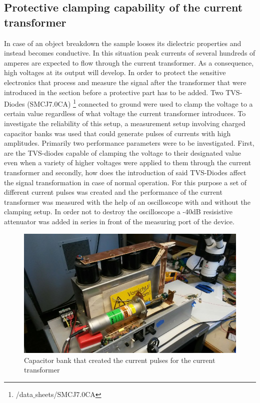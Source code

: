 \subsection{Protective clamping capability of the current transformer}
\label{clamping}

In case of an object breakdown the sample looses its dielectric properties and instead becomes conductive.
In this situation peak currents of several hundreds of amperes are expected to flow through the current transformer.
As a consequence, high voltages at its output will develop. In order to protect the sensitive electronics that
process and measure the signal after the transformer that were introduced in the section before a protective part has to be added.
Two TVS-Diodes (SMCJ7.0CA) \footnote{/data$\_$sheets/SMCJ7.0CA} connected to ground were used to clamp the voltage to a certain value regardless of what voltage the current transformer introduces.
To investigate the reliability of this setup, a measurement setup involving charged capacitor banks was used that could generate
pulses of currents with high amplitudes. 
Primarily two performance parameters were to be investigated. First, are the TVS-diodes capable of clamping the voltage to their designated value even when
a variety of higher voltages were applied to them through the current transformer and secondly, how does the introduction of said TVS-Diodes affect the
signal transformation in case of normal operation. 
\newline
For this purpose a set of different current pulses was created and the performance of the current transformer was measured with the help of an
oscilloscope with and without the clamping setup. In order not to destroy the oscilloscope a -40dB resisistive attenuator was added in series in front of
the measuring port of the device.

\begin{figure}[h!tb]
\centerline{\includegraphics[scale=0.3]{figures/Method/Clamp/capacitorbank.jpg}}
    \caption{Capacitor bank that created the current pulses for the current transformer}
    \label{fig.clamp}
\end{figure}



